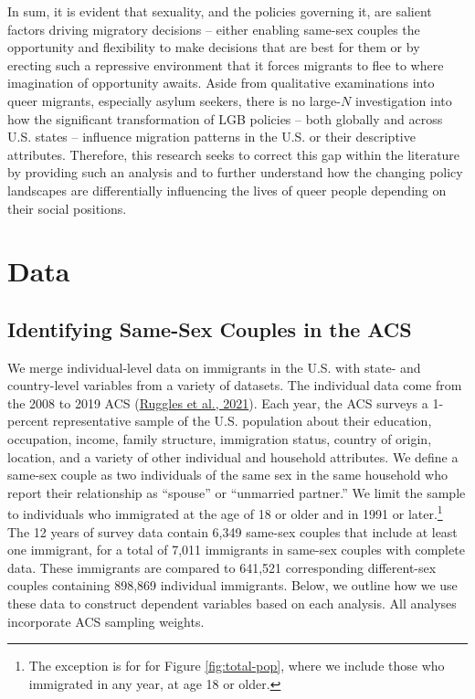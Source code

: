 \documentclass[
  11pt,
]{article}
\begin{document}
In sum, it is evident that sexuality, and the policies governing it, are salient factors driving migratory decisions -- either enabling same-sex couples the opportunity and flexibility to make decisions that are best for them or by erecting such a repressive environment that it forces migrants to flee to where imagination of opportunity awaits. Aside from qualitative examinations into queer migrants, especially asylum seekers, there is no large-\(N\) investigation into how the significant transformation of LGB policies -- both globally and across U.S. states -- influence migration patterns in the U.S. or their descriptive attributes. Therefore, this research seeks to correct this gap within the literature by providing such an analysis and to further understand how the changing policy landscapes are differentially influencing the lives of queer people depending on their social positions.

\hypertarget{data}{%
\section{Data}\label{data}}

\hypertarget{identifying-same-sex-couples-in-the-acs}{%
\subsection{Identifying Same-Sex Couples in the ACS}\label{identifying-same-sex-couples-in-the-acs}}

We merge individual-level data on immigrants in the U.S. with state- and country-level variables from a variety of datasets. The individual data come from the 2008 to 2019 ACS (\protect\hyperlink{ref-ruggles_2021}{Ruggles et al., 2021}). Each year, the ACS surveys a 1-percent representative sample of the U.S. population about their education, occupation, income, family structure, immigration status, country of origin, location, and a variety of other individual and household attributes. We define a same-sex couple as two individuals of the same sex in the same household who report their relationship as ``spouse'' or ``unmarried partner.'' We limit the sample to individuals who immigrated at the age of 18 or older and in 1991 or later.\footnote{The exception is for for Figure \ref{fig:total-pop}, where we include those who immigrated in any year, at age 18 or older.} The 12 years of survey data contain 6,349 same-sex couples that include at least one immigrant, for a total of 7,011 immigrants in same-sex couples with complete data. These immigrants are compared to 641,521 corresponding different-sex couples containing 898,869 individual immigrants. Below, we outline how we use these data to construct dependent variables based on each analysis. All analyses incorporate ACS sampling weights.
\end{document}
